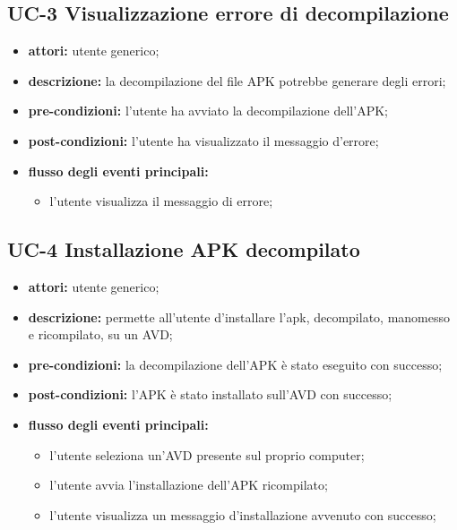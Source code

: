 \subsection*{UC-3 Visualizzazione errore di decompilazione}\label{subsec:uc-3-visualizzazione-errore-di-decompilazione}
\begin{itemize}
    \item \textbf{attori:} utente generico;
    \item \textbf{descrizione:} la decompilazione del file APK potrebbe generare degli errori;
    \item \textbf{pre-condizioni:} l'utente ha avviato la decompilazione dell'APK;
    \item \textbf{post-condizioni:} l'utente ha visualizzato il messaggio d'errore;
    \item \textbf{flusso degli eventi principali:}
    \begin{itemize}
        \item l'utente visualizza il messaggio di errore;
    \end{itemize}
\end{itemize}
\subsection*{UC-4 Installazione APK decompilato}\label{subsec:uc-4-installazione-apk-decompilato}
\begin{itemize}
    \item \textbf{attori:} utente generico;
    \item \textbf{descrizione:} permette all'utente d'installare l'apk, decompilato, manomesso e ricompilato, su un AVD;
    \item \textbf{pre-condizioni:} la decompilazione dell'APK è stato eseguito con successo;
    \item \textbf{post-condizioni:} l'APK è stato installato sull'AVD con successo;
    \item \textbf{flusso degli eventi principali:}
    \begin{itemize}
        \item l'utente seleziona un'AVD presente sul proprio computer;
        \item l'utente avvia l'installazione dell'APK ricompilato;
        \item l'utente visualizza un messaggio d'installazione avvenuto con successo;
    \end{itemize}
\end{itemize}
